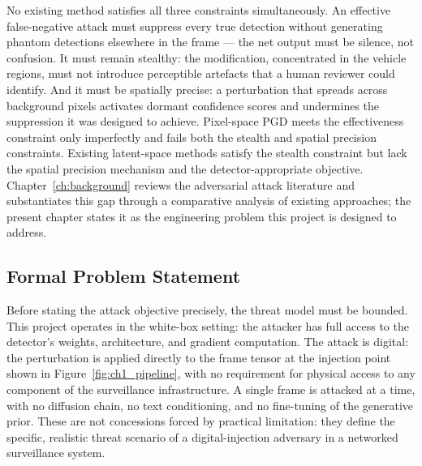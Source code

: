 \documentclass[12pt,a4paper]{report}
\begin{document}
No existing method satisfies all three constraints simultaneously.
An effective false-negative attack must suppress every true
detection without generating phantom detections elsewhere in the
frame --- the net output must be silence, not confusion. It must
remain stealthy: the modification, concentrated in the vehicle
regions, must not introduce perceptible artefacts that a human
reviewer could identify. And it must be spatially precise: a
perturbation that spreads across background pixels activates
dormant confidence scores and undermines the suppression it was
designed to achieve. Pixel-space PGD meets the effectiveness
constraint only imperfectly and fails both the stealth and spatial
precision constraints. Existing latent-space methods satisfy the
stealth constraint but lack the spatial precision mechanism and
the detector-appropriate objective. Chapter~\ref{ch:background}
reviews the adversarial attack literature and substantiates this
gap through a comparative analysis of existing approaches; the
present chapter states it as the engineering problem this project
is designed to address.

\subsection{Formal Problem Statement}
\label{sec:problem_statement}

Before stating the attack objective precisely, the threat model
must be bounded. This project operates in the white-box setting:
the attacker has full access to the detector's weights,
architecture, and gradient computation. The attack is digital: the
perturbation is applied directly to the frame tensor at the
injection point shown in Figure~\ref{fig:ch1_pipeline}, with no
requirement for physical access to any component of the
surveillance infrastructure. A single frame is attacked at a time,
with no diffusion chain, no text conditioning, and no fine-tuning
of the generative prior. These are not concessions forced by
practical limitation: they define the specific, realistic threat
scenario of a digital-injection adversary in a networked
surveillance system.
\end{document}
